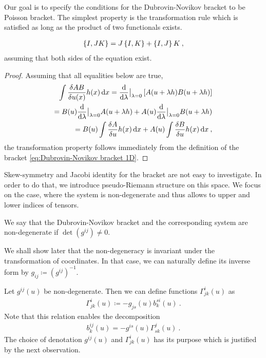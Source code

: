 Our goal is to specify the conditions for the Dubrovin-Novikov bracket to be Poisson bracket. The simplest property is the transformation rule which is satisfied as long as the product of two functionals exists.

\begin{proposition}
    \begin{align}
        \left \lbrace I,JK \right \rbrace = J \left \lbrace I,K \right \rbrace + \left \lbrace I,J \right \rbrace K \:,
    \end{align}
    assuming that both sides of the equation exist.
\end{proposition}
\begin{proof}
    Assuming that all equalities below are true,
    \begin{align}
        \int \frac{\delta AB}{\delta u(x)} h(x) \, \mathrm{d} x = \frac{\mathrm{d}}{\mathrm{d}\lambda} \big|_{\lambda = 0} \left[ A(u+ \lambda h) B(u+ \lambda h) \right] 
        \\ = B(u) \frac{\mathrm{d}}{\mathrm{d}\lambda} \big|_{\lambda = 0} A(u+ \lambda h) + A(u) \frac{\mathrm{d}}{\mathrm{d}\lambda} \big|_{\lambda = 0} B(u+ \lambda h)
        \\ = B(u) \int \frac{\delta A}{\delta u} h(x) \, \mathrm{d} x + A(u) \int \frac{\delta B}{\delta u} h(x) \, \mathrm{d} x \:,
    \end{align}
    the transformation property follows immediately from the definition of the bracket \eqref{eq:Dubrovin-Novikov bracket 1D}.
\end{proof}


Skew-symmetry and Jacobi identity for the bracket are not easy to investigate. In order to do that, we introduce pseudo-Riemann structure on this space. We focus on the case, where the system is non-degenerate and thus allows to upper and lower indices of tensors.

\begin{definition}
    We say that the Dubrovin-Novikov bracket and the corresponding system are non-degenerate if $\det(g^{ij}) \neq 0$.
\end{definition}

 We shall show later that the non-degeneracy is invariant under the transformation of coordinates. In that case, we can naturally define its inverse form by $g_{ij} \coloneqq (g^{ij})^{-1}$.

Let $g^{ij}(u)$ be non-degenerate. Then we can define functions $\Gamma^{i}_{jk}(u)$ as
\begin{align}
    \Gamma^i_{jk}(u) \coloneqq - g_{js}(u) b^{s i}_k(u) \:. \label{eq:Gamma=g*b}
\end{align}
Note that this relation enables the decomposition
\begin{align}
    b_k^{ij}(u) = -g^{is}(u) \Gamma^j_{sk}(u) \:. \label{eq:b=g*Gamma}
\end{align}
The choice of denotation $g^{ij}(u)$ and $\Gamma^{i}_{jk}(u)$ has its purpose which is justified by the next observation.

